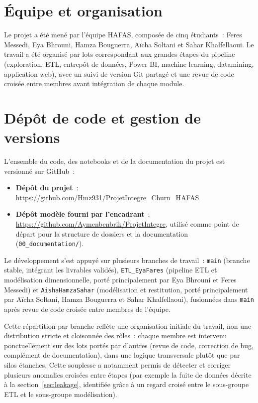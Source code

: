\documentclass[11pt,a4paper]{report}
\begin{document}
\section{\'Equipe et organisation}

Le projet a \'et\'e men\'e par l'\'equipe HAFAS, compos\'ee de cinq \'etudiants~:
Feres Messedi, Eya Bhrouni, Hamza Bouguerra, A\"icha Soltani et Sahar
Khalfellaoui. Le travail a \'et\'e organis\'e par lots correspondant aux grandes
\'etapes du pipeline (exploration, ETL, entrep\^ot de donn\'ees, Power BI, machine
learning, datamining, application web), avec un suivi de version Git partag\'e
et une revue de code crois\'ee entre membres avant int\'egration de chaque
module.

\section{D\'ep\^ot de code et gestion de versions}

L'ensemble du code, des notebooks et de la documentation du projet est
versionn\'e sur GitHub~:

\begin{itemize}
	\item \textbf{D\'ep\^ot du projet}~:
	\url{https://github.com/Hmz931/ProjetIntegre_Churn_HAFAS}
	\item \textbf{D\'ep\^ot mod\`ele fourni par l'encadrant}~:
	\url{https://github.com/Aymenbenbrik/ProjetIntegre}, utilis\'e comme
	point de d\'epart pour la structure de dossiers et la documentation
	(\texttt{00\_documentation/}).
\end{itemize}

Le d\'eveloppement s'est appuy\'e sur plusieurs branches de travail~:
\texttt{main} (branche stable, int\'egrant les livrables valid\'es),
\texttt{ETL\_EyaFares} (pipeline ETL et mod\'elisation dimensionnelle, port\'e
principalement par Eya Bhrouni et Feres Messedi) et
\texttt{AishaHamzaSahar} (mod\'elisation et restitution, port\'e
principalement par A\"icha Soltani, Hamza Bouguerra et Sahar Khalfellaoui),
fusionn\'ees dans \texttt{main} apr\`es revue de code crois\'ee entre membres de
l'\'equipe.

Cette r\'epartition par branche refl\`ete une organisation initiale du travail,
non une distribution stricte et cloisonn\'ee des r\^oles~: chaque membre est
intervenu ponctuellement sur des lots port\'es par d'autres (revue de code,
correction de bug, compl\'ement de documentation), dans une logique
transversale plut\^ot que par silos \'etanches. Cette souplesse a notamment
permis de d\'etecter et corriger plusieurs anomalies crois\'ees entre \'etapes
(par exemple la fuite de donn\'ees d\'ecrite \`a la section~\ref{sec:leakage},
identifi\'ee gr\^ace \`a un regard crois\'e entre le sous-groupe ETL et le
sous-groupe mod\'elisation).
\end{document}

